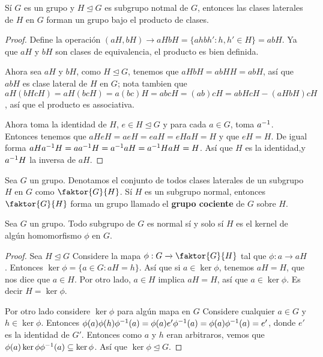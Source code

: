 \begin{theorem}\label{thm_4.9}
    S\'i $G$ es un grupo y  $H \unlhd G$ es subgrupo notmal de $G$, entonces las
    clases laterales de $H$ en  $G$ forman un grupo bajo el producto de clases.
\end{theorem}
\begin{proof}
    Define la operaci\'on $(aH,bH) \xrightarrow{} aHbH=\{ahbh' : h,h' \in
    H\}=abH$.  Ya que $aH$ y $bH$ son clases de equivalencia, el producto es
    bien definida.

    Ahora sea  $aH$ y  $bH$, como  $H \unlhd G$, tenemos que  $aHbH=abHH=abH$,
    as\'i que $abH$ es clase lateral de $H$ en  $G$; nota tambien que
    $aH(bHcH)=aH(bcH)=a(bc)H=abcH=(ab)cH=abHcH-(aHbH)cH$, as\'i que el producto
    es associativa.

    Ahora toma la identidad de $H$, $e \in H \unlhd G$ y para cada  $a \in G$,
    toma  $a^{-1}$. Entonces tenemos que $aHeH=aeH=eaH=eHaH=H$ y que  $eH=H$.
    De igual forma  $aHa^{-1}H=aa^{-1}H=a^{-1}aH=a^{-1}HaH=H$. As\'i que $H$
    es la identidad,y  $a^{-1}H$ la inversa de $aH$.
\end{proof}

\begin{definition}
    Sea $G$ un grupo. Denotamos el conjunto de todos clases laterales de un
    subgrupo $H$ en $G$ como $\faktor{G}{H}$. S\'i $H$ es un subgrupo normal,
    entonces  $\faktor{G}{H}$ forma un grupo llamado el \textbf{grupo cociente}
    de $G$ sobre $H$.
\end{definition}

\begin{lemma}\label{lemma_4.10}
    Sea $G$ un grupo. Todo subgrupo de  $G$ es normal s\'i y solo s\'i $H$ es el
    kernel de alg\'un homomorfismo  $\phi$ en  $G$.
\end{lemma}
\begin{proof}
    Sea $H \unlhd G$ Considere la mapa  $\phi:G \xrightarrow{} \faktor{G}{H}$
    tal que $\phi:a \xrightarrow{} aH$. Entonces $\ker{\phi}=\{a \in G :
    aH=h\}$. As\'i que si $a \in \ker{\phi}$, tenemos $aH=H$, que nos dice que
    $a \in H$. Por otro lado,  $a \in H$ implica  $aH=H$, as\'i que  $a \in
    \ker{\phi}$. Es decir $H=\ker{\phi}$.

    Por otro lado considere $\ker{\phi}$ para alg\'un mapa en $G$ Considere
    cualquier $a \in G$ y  $h \in \ker{\phi}$. Entonces
    $\phi(a)\phi(h)\phi^{-1}(a)=\phi(a)e'\phi^{-1}(a)=\phi(a)\phi^{-1}(a)=e'$,
    donde $e'$ es la identidad de $G'$. Entonces como $a$ y $h$ eran
    arbitraros, vemos que $\phi(a)\ker{\phi}\phi^{-1}(a) \subseteq \ker{\phi}$.
    As\'i que $\ker{\phi} \unlhd G$.
\end{proof}

